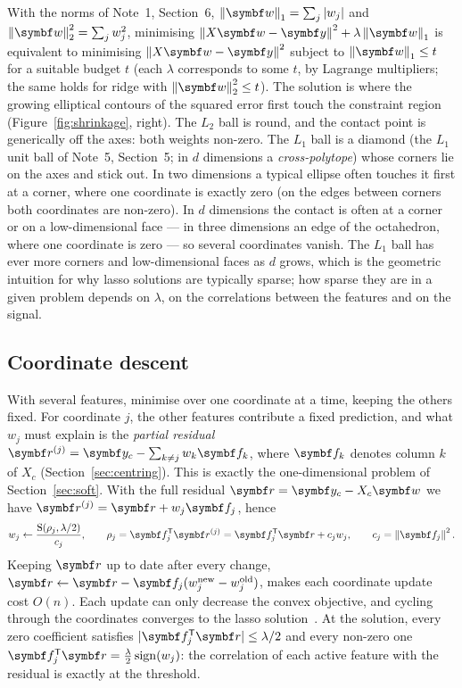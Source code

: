 \documentclass[11pt]{article}
\newcommand{\w}{\vect{w}}
\newcommand{\y}{\vect{y}}
\newcommand{\soft}{\operatorname{S}}
\newcommand{\vr}{\vect{r}}
\begin{document}
With the norms of Note~1, Section~6, $\norm{\w}_1 = \sum_j |w_j|$ and $\norm{\w}_2^2 = \sum_j w_j^2$, minimising
$\norm{X\w - \y}^2 + \lambda\norm{\w}_1$ is equivalent to minimising $\norm{X\w - \y}^2$ subject to
$\norm{\w}_1 \le t$ for a suitable budget $t$ (each $\lambda$ corresponds to some $t$, by Lagrange multipliers; the
same holds for ridge with $\norm{\w}_2^2 \le t$). The solution is where the growing elliptical contours of the squared
error first touch the constraint region (Figure~\ref{fig:shrinkage}, right). The $L_2$ ball is round, and the contact
point is generically off the axes: both weights non-zero. The $L_1$ ball is a diamond (the $L_1$ unit ball of Note~5,
Section~5; in $d$ dimensions a \emph{cross-polytope}) whose corners lie on the axes and stick out. In two dimensions a
typical ellipse often touches it first at a corner, where one coordinate is exactly zero (on the edges between corners
both coordinates are non-zero). In $d$ dimensions the contact is often at a corner or on a low-dimensional face --- in
three dimensions an edge of the octahedron, where one coordinate is zero --- so several coordinates vanish. The $L_1$
ball has ever more corners and low-dimensional faces as $d$ grows, which is the geometric intuition for why lasso
solutions are typically sparse; how sparse they
are in a given problem depends on $\lambda$, on the correlations between the features and on the signal.

\subsection{Coordinate descent}\label{sec:cd}

With several features, minimise over one coordinate at a time, keeping the others fixed. For coordinate $j$, the
other features contribute a fixed prediction, and what $w_j$ must explain is the \emph{partial residual}
$\vr^{(j)} = \y_c - \sum_{k \ne j} w_k\vect{f}_k$, where $\vect{f}_k$ denotes column $k$ of $X_c$
(Section~\ref{sec:centring}). This is exactly the one-dimensional problem of Section~\ref{sec:soft}. With the full
residual $\vr = \y_c - X_c\w$ we have $\vr^{(j)} = \vr + w_j\vect{f}_j$, hence
\[
  w_j \leftarrow \frac{\soft(\rho_j, \lambda/2)}{c_j}, \qquad \rho_j = \vect{f}_j\T\vr^{(j)} = \vect{f}_j\T\vr + c_j w_j,
  \qquad c_j = \norm{\vect{f}_j}^2 .
\]
Keeping $\vr$ up to date after every change, $\vr \leftarrow \vr -
\vect{f}_j(w_j^{\text{new}} - w_j^{\text{old}})$, makes each coordinate update cost $O(n)$. Each update can only decrease
the convex objective, and cycling through the coordinates converges to the lasso solution~\cite{friedman2010}. At the
solution, every zero coefficient satisfies $|\vect{f}_j\T\vr| \le \lambda/2$ and every non-zero one
$\vect{f}_j\T\vr = \frac{\lambda}{2}\operatorname{sign}(w_j)$: the correlation of each active feature with the residual
is exactly at the threshold.
\end{document}
